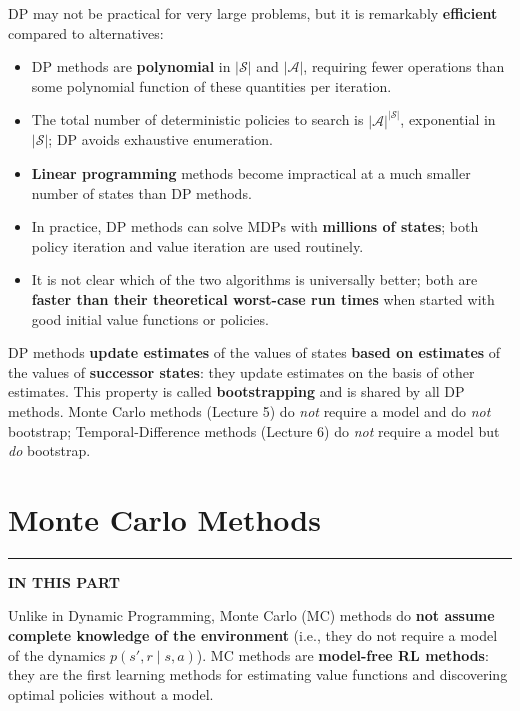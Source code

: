 \documentclass[11pt,a4paper]{article}
\theoremstyle{definition}
\theoremstyle{plain}
\theoremstyle{remark}
\newcommand{\partmtoc}{%
  \vspace{2pt}%
  {\color{rlrule}\rule{\linewidth}{0.5pt}}\par\vspace{3pt}%
  {\footnotesize\bfseries\color{rlaccent}IN THIS PART}\par\vspace{2pt}%
  \begingroup
  \etocsetnexttocdepth{subsection}%
  \localtableofcontents
  \endgroup
  \vspace{2pt}{\color{rlrule}\rule{\linewidth}{0.5pt}}\par\vspace{10pt}}
\begin{document}
DP may not be practical for very large problems, but it is remarkably \textbf{efficient} compared to alternatives:
\begin{itemize}
    \item DP methods are \textbf{polynomial} in $|\mathcal{S}|$ and $|\mathcal{A}|$, requiring fewer operations than some polynomial function of these quantities per iteration.
    \item The total number of deterministic policies to search is $|\mathcal{A}|^{|\mathcal{S}|}$, exponential in $|\mathcal{S}|$; DP avoids exhaustive enumeration.
    \item \textbf{Linear programming} methods become impractical at a much smaller number of states than DP methods.
    \item In practice, DP methods can solve MDPs with \textbf{millions of states}; both policy iteration and value iteration are used routinely.
    \item It is not clear which of the two algorithms is universally better; both are \textbf{faster than their theoretical worst-case run times} when started with good initial value functions or policies.
\end{itemize}

\begin{tcolorbox}[colback=green!5!white, colframe=green!60!black, title={Bootstrapping}]
DP methods \textbf{update estimates} of the values of states \textbf{based on estimates} of the values of \textbf{successor states}: they update estimates on the basis of other estimates. This property is called \textbf{bootstrapping} and is shared by all DP methods. Monte Carlo methods (Lecture 5) do \textit{not} require a model and do \textit{not} bootstrap; Temporal-Difference methods (Lecture 6) do \textit{not} require a model but \textit{do} bootstrap.
\end{tcolorbox}



\part{Monte Carlo Methods}
\partmtoc

Unlike in Dynamic Programming, Monte Carlo (MC) methods do \textbf{not assume complete knowledge of the environment} (i.e., they do not require a model of the dynamics $p(s', r \mid s, a)$). MC methods are \textbf{model-free RL methods}: they are the first learning methods for estimating value functions and discovering optimal policies without a model.
\end{document}
